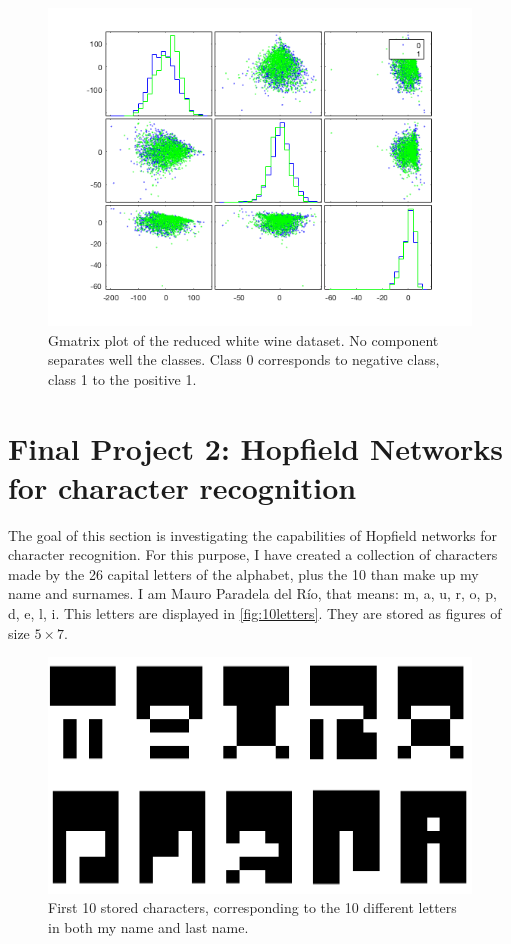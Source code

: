 \documentclass[a4paper, 10pt]{article}
\begin{document}
  \begin{figure}[p]
    \centering
    \includegraphics[width=0.7\linewidth]{./project/wine_gplot.png}
    \caption{Gmatrix plot of the reduced white wine dataset. No component
    separates well the classes. Class 0 corresponds to negative class,
  class 1 to the positive 1.}
    \label{fig:l5_wine_gmatrix}
  \end{figure}

\newpage
\section{Final Project 2: Hopfield Networks for character recognition}
The goal of this section is investigating the capabilities of Hopfield networks
for character recognition. For this purpose, I have created a collection of
characters made by the 26 capital letters of the alphabet, plus the 10 than
make up my name and surnames. I am Mauro Paradela del Río, that means: m, a, u, r, o,
p, d, e, l, i. This letters are displayed in \autoref{fig:10letters}. They are stored
as figures of size $5 \times 7$.

\begin{figure}[htb]
  \centering
  \includegraphics[width=0.5\linewidth]{./project/letters/10letters.png}
  \caption{First 10 stored characters, corresponding to the 10 different letters
  in both my name and last name.}
  \label{fig:10letters}
\end{figure}
\end{document}
